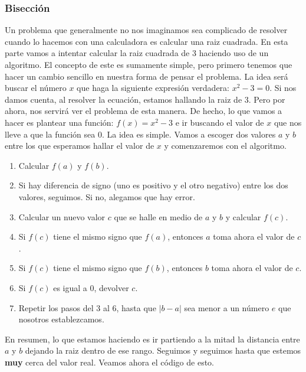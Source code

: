 \documentclass[10pt,letterpaper]{article}
\begin{document}
\subsubsection{Bisecci\'on}
Un problema que generalmente no nos imaginamos sea complicado de resolver cuando lo hacemos con una calculadora es calcular una raiz cuadrada. En esta parte vamos a intentar calcular la raiz cuadrada de 3 haciendo uso de un algoritmo. El concepto de este es sumamente simple, pero primero tenemos que hacer un cambio sencillo en nuestra forma de pensar el problema. La idea ser\'a buscar el n\'umero $x$ que haga la siguiente expresi\'on verdadera: $x^2 - 3 = 0$. Si nos damos cuenta, al resolver la ecuaci\'on, estamos hallando la raiz de 3. Pero por ahora, nos servir\'a ver el problema de esta manera. De hecho, lo que vamos a hacer es plantear una funci\'on: $f \left( x \right) = x^2 - 3$ e ir buscando el valor de $x$ que nos lleve a que la funci\'on sea $0$. La idea es simple. Vamos a escoger dos valores $a$ y $b$ entre los que esperamos hallar el valor de $x$ y comenzaremos con el algoritmo.

\begin{enumerate}
\item Calcular $f \left( a \right)$ y $f \left( b \right)$.
\item Si hay diferencia de signo (uno es positivo y el otro negativo) entre los dos valores, seguimos. Si no, alegamos que hay error.
\item Calcular un nuevo valor $c$ que se halle en medio de $a$ y $b$ y calcular $f \left( c \right)$.
\item Si $f \left( c \right)$ tiene el mismo signo que $f \left( a \right)$, entonces $a$ toma ahora el valor de $c$.
\item Si $f \left( c \right)$ tiene el mismo signo que $f \left( b \right)$, entonces $b$ toma ahora el valor de $c$.
\item Si $f \left( c \right)$ es igual a $0$, devolver $c$.
\item Repetir los pasos del 3 al 6, hasta que $\left| b - a \right|$ sea menor a un n\'umero $e$ que nosotros establezcamos.
\end{enumerate}

En resumen, lo que estamos haciendo es ir partiendo a la mitad la distancia entre $a$ y $b$ dejando la raiz dentro de ese rango. Seguimos y seguimos hasta que estemos \textbf{muy} cerca del valor real. Veamos ahora el c\'odigo de esto.
\end{document}
